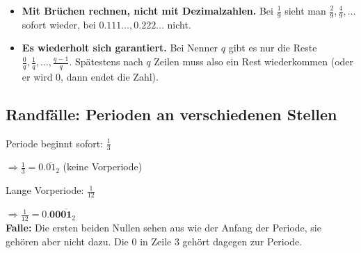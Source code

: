 \begin{merke}
  \begin{itemize}[nosep]
    \item \textbf{Mit Brüchen rechnen, nicht mit Dezimalzahlen.} Bei $\tfrac19$ sieht man
          $\tfrac29, \tfrac49, \ldots$ sofort wieder, bei $0.111\ldots, 0.222\ldots$ nicht.
    \item \textbf{Es wiederholt sich garantiert.} Bei Nenner $q$ gibt es nur die Reste
          $\tfrac0q, \tfrac1q, \ldots, \tfrac{q-1}q$. Spätestens nach $q$ Zeilen
          muss also ein Rest wiederkommen (oder er wird 0, dann endet die Zahl).
  \end{itemize}
\end{merke}

\subsection*{Randfälle: Perioden an verschiedenen Stellen}

\begin{beispiel}{Periode beginnt sofort: $\tfrac13$}
  \qquad $\Rightarrow \tfrac13 = 0.\overline{01}_2$ \quad (keine Vorperiode)
\end{beispiel}

\begin{beispiel}{Lange Vorperiode: $\tfrac1{12}$}
  \qquad $\Rightarrow \tfrac1{12} = 0.\mathbf{00}\overline{\mathbf{01}}_2$\\[4pt]
  \textbf{Falle:} Die ersten beiden Nullen sehen aus wie der Anfang der Periode, sie
  gehören aber nicht dazu. Die 0 in Zeile 3 gehört dagegen zur Periode.
\end{beispiel}

